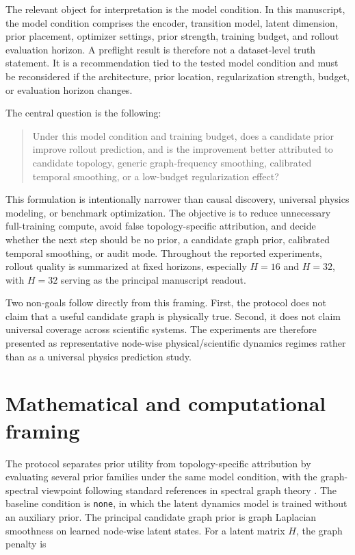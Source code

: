 \documentclass[preprint,12pt]{elsarticle}
\begin{document}
The relevant object for interpretation is the model condition. In this manuscript, the model condition comprises the encoder, transition model, latent dimension, prior placement, optimizer settings, prior strength, training budget, and rollout evaluation horizon. A preflight result is therefore not a dataset-level truth statement. It is a recommendation tied to the tested model condition and must be reconsidered if the architecture, prior location, regularization strength, budget, or evaluation horizon changes.

The central question is the following:

\begin{quote}
Under this model condition and training budget, does a candidate prior improve rollout prediction, and is the improvement better attributed to candidate topology, generic graph-frequency smoothing, calibrated temporal smoothing, or a low-budget regularization effect?
\end{quote}

This formulation is intentionally narrower than causal discovery, universal physics modeling, or benchmark optimization. The objective is to reduce unnecessary full-training compute, avoid false topology-specific attribution, and decide whether the next step should be no prior, a candidate graph prior, calibrated temporal smoothing, or audit mode. Throughout the reported experiments, rollout quality is summarized at fixed horizons, especially $H=16$ and $H=32$, with $H=32$ serving as the principal manuscript readout.

Two non-goals follow directly from this framing. First, the protocol does not claim that a useful candidate graph is physically true. Second, it does not claim universal coverage across scientific systems. The experiments are therefore presented as representative node-wise physical/scientific dynamics regimes rather than as a universal physics prediction study.

\section{Mathematical and computational framing}

The protocol separates prior utility from topology-specific attribution by evaluating several prior families under the same model condition, with the graph-spectral viewpoint following standard references in spectral graph theory \citep{chung1997spectral}. The baseline condition is \texttt{none}, in which the latent dynamics model is trained without an auxiliary prior. The principal candidate graph prior is graph Laplacian smoothness on learned node-wise latent states. For a latent matrix $H$, the graph penalty is
\end{document}
